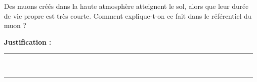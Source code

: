 Des muons créés dans la haute atmosphère atteignent le sol, alors que leur durée de vie propre est très courte. Comment explique-t-on ce fait dans le référentiel du muon ?

\choices

\noindent\textbf{Justification :} \hrulefill \\[2.5ex]
\rule{\linewidth}{0.4pt} \\[2.5ex]
\rule{\linewidth}{0.4pt}
\vfill
